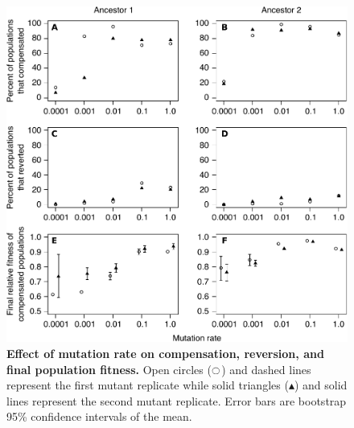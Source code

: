 \begin{doublespace}
\begin{figure}
\begin{center}
\includegraphics[width=\linewidth]{effect-U.pdf}
\end{center}
\caption{
  {\bf Effect of mutation rate on compensation, reversion,
  and final population fitness.}
  Open circles ($\ocircle$) and dashed lines
  represent the first mutant replicate
  while solid triangles ($\blacktriangle$) and solid lines
  represent the second mutant replicate.
  Error bars are bootstrap 95\% confidence intervals of the mean.}
\label{fig:U_comp}
\end{figure}




\end{doublespace}
